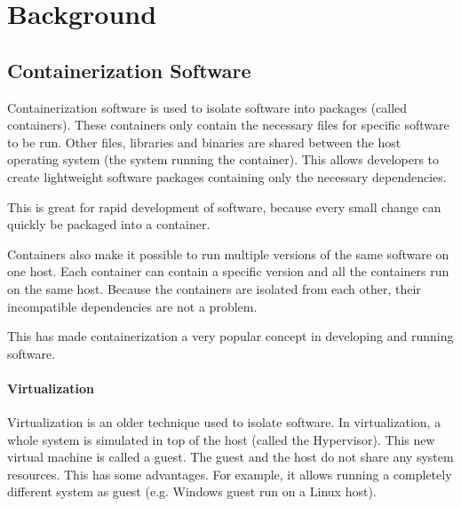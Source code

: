 \chapter{Background}

\section{Containerization Software}


Containerization software is used to isolate software into packages (called containers). These containers only contain the necessary files for specific software to be run. Other files, libraries and binaries are shared between the host operating system (the system running the container). This allows developers to create lightweight software packages containing only the necessary dependencies.

\hfill

This is great for rapid development of software, because every small change can quickly be packaged into a container.

Containers also make it possible to run multiple versions of the same software on one host. Each container can contain a specific version and all the containers run on the same host. Because the containers are isolated from each other, their incompatible dependencies are not a problem.

\hfill

This has made containerization a very popular concept in developing and running software.

\subsubsection{Virtualization}

Virtualization is an older technique used to isolate software. In virtualization, a whole system is simulated in top of the host (called the Hypervisor). This new virtual machine is called a guest. The guest and the host do not share any system resources. This has some advantages. For example, it allows running a completely different system as guest (e.g. Windows guest run on a Linux host).

